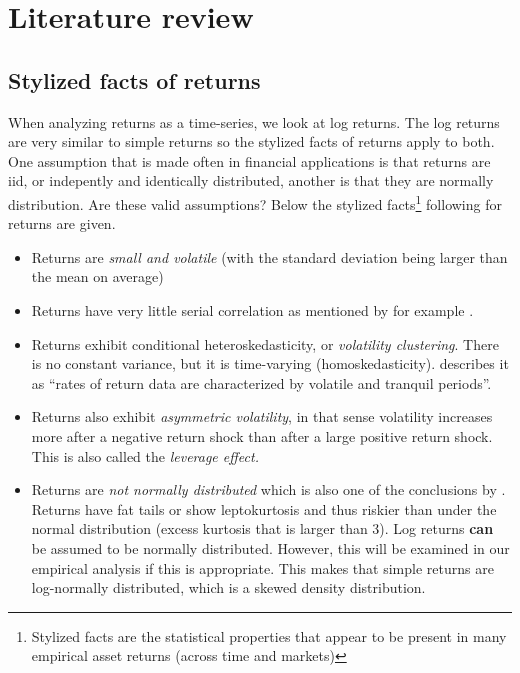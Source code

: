 \documentclass[a4paper, twoside]{templates/ociamthesis}
\begin{document}
\hypertarget{lit-rev}{%
\chapter{Literature review}\label{lit-rev}}

\minitoc 

\hypertarget{stylized-facts-of-returns}{%
\section{Stylized facts of returns}\label{stylized-facts-of-returns}}

When analyzing returns as a time-series, we look at log returns. The log returns are very similar to simple returns so the stylized facts of returns apply to both. One assumption that is made often in financial applications is that returns are iid, or indepently and identically distributed, another is that they are normally distribution. Are these valid assumptions? Below the stylized facts\footnote{Stylized facts are the statistical properties that appear to be present in many empirical asset returns (across time and markets)} following \textcite{annaert2021} for returns are given.

\begin{itemize}
\item
  Returns are \emph{small and volatile} (with the standard deviation being larger than the mean on average)
\item
  Returns have very little serial correlation as mentioned by for example \textcite{bollerslev1987}.
\item
  Returns exhibit conditional heteroskedasticity, or \emph{volatility clustering}. There is no constant variance, but it is time-varying (homoskedasticity). \textcite{bollerslev1987} describes it as ``rates of return data are characterized by volatile and tranquil periods''.
\item
  Returns also exhibit \emph{asymmetric volatility}, in that sense volatility increases more after a negative return shock than after a large positive return shock. This is also called the \emph{leverage effect.}
\item
  Returns are \emph{not normally distributed} which is also one of the conclusions by \textcite{fama1965}. Returns have fat tails or show leptokurtosis and thus riskier than under the normal distribution (excess kurtosis that is larger than 3). Log returns \textbf{can} be assumed to be normally distributed. However, this will be examined in our empirical analysis if this is appropriate. This makes that simple returns are log-normally distributed, which is a skewed density distribution.
\end{itemize}
\end{document}
